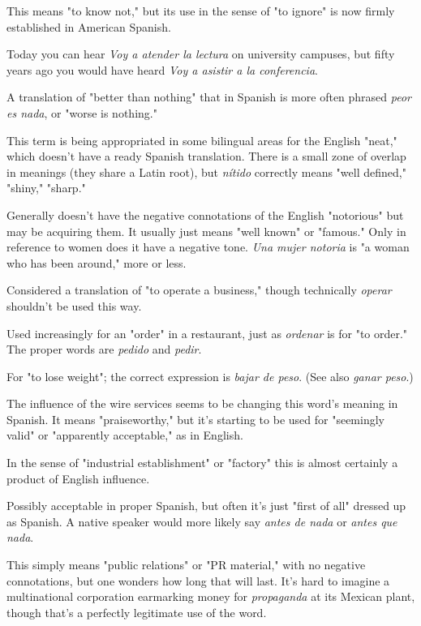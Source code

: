  This means "to know not," but its use in the sense
of "to ignore" is now firmly established in American Spanish.

 Today you can hear \emph{Voy a atender la lectura} on
university campuses, but fifty years ago you would have heard \emph{Voy a
asistir a la conferencia}.

 A translation of "better than nothing"
that in Spanish is more often phrased \emph{peor es nada}, or "worse is
nothing."

 This term is being appropriated in some bilingual
areas for the English "neat," which doesn't have a ready Spanish translation. There is a small zone of overlap in meanings (they share a Latin
root), but \emph{nítido} correctly means "well defined," "shiny," "sharp."

 Generally doesn't have the negative connotations
of the English "notorious" but may be acquiring them. It usually just
means "well known" or "famous." Only in reference to women does it
have a negative tone. \emph{Una mujer notoria} is "a woman who has been
around," more or less.

 Considered a translation of "to operate a business," though technically \emph{operar} shouldn't be used this way.

 Used increasingly for an "order" in a restaurant, just
as \emph{ordenar} is for "to order." The proper words are \emph{pedido} and \emph{pedir}.

 For "to lose weight"; the correct expression is
\emph{bajar de peso}. (See also \emph{ganar peso}.)

 The influence of the wire services seems to be
changing this word's meaning in Spanish. It means "praiseworthy," but
it's starting to be used for "seemingly valid" or "apparently acceptable," as in English.

 In the sense of "industrial establishment" or "factory" this is almost certainly a product of English influence.

 Possibly acceptable in proper Spanish,
but often it's just "first of all" dressed up as Spanish. A native speaker
would more likely say \emph{antes de nada} or \emph{antes que nada}.

 This simply means "public relations" or "PR
material," with no negative connotations, but one wonders how long
that will last. It's hard to imagine a multinational corporation earmarking money for \emph{propaganda} at its Mexican plant, though that's
a perfectly legitimate use of the word.

